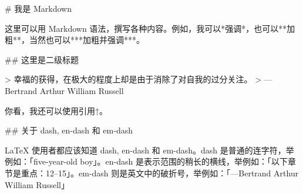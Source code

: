 \documentclass[UTF8]{ctexart}
\begin{document}
\begin{markdown}
# 我是 Markdown

这里可以用 Markdown 语法，撰写各种内容。例如，我可以*强调*，也可以**加粗**，当然也可以***加粗并强调***。

## 这里是二级标题

> 幸福的获得，在极大的程度上却是由于消除了对自我的过分关注。
> ---Bertrand Arthur William Russell

你看，我还可以使用引用↑。

## 关于 dash, en-dash 和 em-dash

LaTeX 使用者都应该知道 dash, en-dash 和 em-dash。dash 是普通的连字符，举例如：「five-year-old boy」。en-dash 是表示范围的稍长的横线，举例如：「以下章节是重点：12--15」。em-dash 则是英文中的破折号，举例如：「---Bertrand Arthur William Russell」
\end{markdown}
\end{document}
